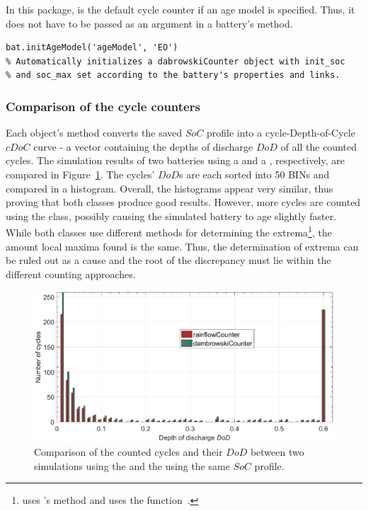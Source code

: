 In this package,  is the default cycle counter if an age model is specified. Thus, it does not have to be passed as an argument in a battery's  method.
\begin{lstlisting}
bat.initAgeModel('ageModel', 'EO')
% Automatically initializes a dabrowskiCounter object with init_soc
% and soc_max set according to the battery's properties and links.
\end{lstlisting}

\subsubsection{Comparison of the cycle counters}
Each  object's  method converts the saved $SoC$ profile into a cycle-Depth-of-Cycle $cDoC$ curve - a vector containing the depths of discharge $DoD$ of all the counted cycles. The simulation results of two batteries using a  and a , respectively, are compared in Figure~\ref{fig:cdoc_hists}. The cycles' $DoD$s are each sorted into 50 BINs and compared in a histogram. Overall, the histograms appear very similar, thus proving that both classes produce good results. However, more cycles are counted using the  class, possibly causing the simulated battery to age slightly faster. While both classes use different methods for determining the extrema\footnote{ uses 's  method and  uses the  function~\cite{nieslony_rainflow_2010}.}, the amount local maxima found is the same. Thus, the determination of extrema can be ruled out as a cause and the root of the discrepancy must lie within the different counting approaches.
\begin{figure}[t!]
	\captionsetup{type=figure}
	\centering
	\includegraphics[width=\textwidth]{cdoc_hists}
	\caption[Comparison of the counted cycles and their $DoD$ between two simulations using the  and the  using the same $SoC$ profile]{Comparison of the counted cycles and their $DoD$ between two simulations using the  and the  using the same $SoC$ profile.}
	\label{fig:cdoc_hists}
\end{figure}

